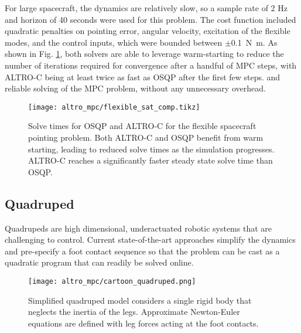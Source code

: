 \documentclass[../root.tex]{subfiles}
\begin{document}

For large spacecraft, the dynamics are relatively slow, so a sample rate of 2
Hz and horizon of 40 seconds were used for this problem. The cost function
included quadratic penalties on pointing error, angular velocity, excitation
of the flexible modes, and the control inputs, which were bounded between
$\pm$\SI{0.1}{\N\m}. As shown in Fig. \ref{fig:flex_sat}, both solvers are
able to leverage warm-starting to reduce the number of iterations required
for convergence after a handful of MPC steps, with ALTRO-C being at least
twice as fast as OSQP after the first few steps. %
and reliable solving of the MPC problem, without any unnecessary overhead.

\begin{figure}
    \centering
    \texttt{[image: altro\_mpc/flexible\_sat\_comp.tikz]}
    \caption{Solve times for OSQP and ALTRO-C for the flexible spacecraft
    pointing problem. Both ALTRO-C and OSQP benefit from warm starting,
    leading to reduced solve times as the simulation progresses. ALTRO-C
    reaches a significantly faster steady state solve time than OSQP.}
    \label{fig:flex_sat}
\end{figure}
    

\subsection{Quadruped}
Quadrupeds are high dimensional, underactuated robotic systems that are
challenging to control.
Current state-of-the-art approaches simplify the dynamics and pre-specify a
foot contact sequence so that the problem can be cast as a quadratic program
that can readily be solved online.
\begin{figure}
    \centering
    \texttt{[image: altro\_mpc/cartoon\_quadruped.png]}
    \caption{Simplified quadruped model considers a single rigid body that neglects the inertia of the legs. Approximate Newton-Euler equations are defined with leg forces acting at the foot contacts.}
    \label{fig:quad_cartoon}
\end{figure}
\end{document}
